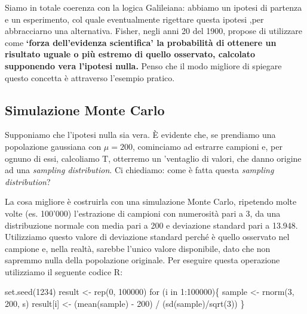 \documentclass[a4paper,12pt,oneside]{book}
\newenvironment{Shaded}{}{}
\newcommand{\KeywordTok}[1]{#1}
\newcommand{\DecValTok}[1]{#1}
\newcommand{\StringTok}[1]{#1}
\newcommand{\ControlFlowTok}[1]{#1}
\newcommand{\OperatorTok}[1]{#1}
\newcommand{\NormalTok}[1]{#1}
\begin{document}
Siamo in totale coerenza con la logica Galileiana: abbiamo un ipotesi di partenza e un esperimento, col quale eventualmente rigettare questa ipotesi ,per abbracciarno una alternativa. Fisher, negli anni 20 del 1900, propose di utilizzare come \textbf{`forza dell'evidenza scientifica' la probabilità di ottenere un risultato uguale o più estremo di quello osservato, calcolato supponendo vera l'ipotesi nulla.} Penso che il modo migliore di spiegare questo concetta è attraverso l'esempio pratico.

\hypertarget{simulazione-monte-carlo}{%
\subsection{Simulazione Monte Carlo}\label{simulazione-monte-carlo}}

Supponiamo che l'ipotesi nulla sia vera. È evidente che, se prendiamo una popolazione gaussiana con \(\mu = 200\), cominciamo ad estrarre campioni e, per ognuno di essi, calcoliamo T, otterremo un 'ventaglio di valori, che danno origine ad una \emph{sampling distribution}. Ci chiediamo: come è fatta questa \emph{sampling distribution}?

La cosa migliore è costruirla con una simulazione Monte Carlo, ripetendo molte volte (es. 100'000) l'estrazione di campioni con numerosità pari a 3, da una distribuzione normale con media pari a 200 e deviazione standard pari a 13.948. Utilizziamo questo valore di deviazione standard perché è quello osservato nel campione e, nella realtà, sarebbe l'unico valore disponibile, dato che non sapremmo nulla della popolazione originale. Per eseguire questa operazione utilizziamo il seguente codice R:

\begin{Shaded}
\begin{Highlighting}[]
\KeywordTok{set.seed}\NormalTok{(}\DecValTok{1234}\NormalTok{)}
\NormalTok{result <-}\StringTok{ }\KeywordTok{rep}\NormalTok{(}\DecValTok{0}\NormalTok{, }\DecValTok{100000}\NormalTok{)}
\ControlFlowTok{for}\NormalTok{ (i }\ControlFlowTok{in} \DecValTok{1}\OperatorTok{:}\DecValTok{100000}\NormalTok{)\{}
\NormalTok{  sample <-}\StringTok{ }\KeywordTok{rnorm}\NormalTok{(}\DecValTok{3}\NormalTok{, }\DecValTok{200}\NormalTok{, s)}
\NormalTok{  result[i] <-}\StringTok{ }\NormalTok{(}\KeywordTok{mean}\NormalTok{(sample) }\OperatorTok{-}\StringTok{ }\DecValTok{200}\NormalTok{) }\OperatorTok{/}\StringTok{ }\NormalTok{(}\KeywordTok{sd}\NormalTok{(sample)}\OperatorTok{/}\KeywordTok{sqrt}\NormalTok{(}\DecValTok{3}\NormalTok{))}
\NormalTok{\}}
\end{Highlighting}
\end{Shaded}
\end{document}

